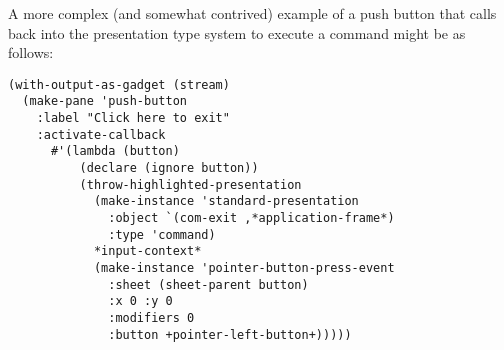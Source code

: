 A more complex (and somewhat contrived) example of a push button that calls back
into the presentation type system to execute a command might be as follows:

\begin{verbatim}
(with-output-as-gadget (stream)
  (make-pane 'push-button
    :label "Click here to exit"
    :activate-callback
      #'(lambda (button)
          (declare (ignore button))
          (throw-highlighted-presentation
            (make-instance 'standard-presentation
              :object `(com-exit ,*application-frame*)
              :type 'command)
            *input-context*
            (make-instance 'pointer-button-press-event
              :sheet (sheet-parent button)
              :x 0 :y 0
              :modifiers 0
              :button +pointer-left-button+)))))
\end{verbatim}
